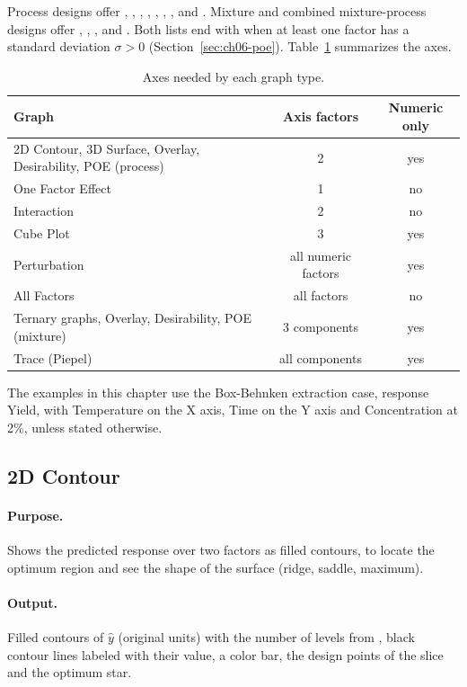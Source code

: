 Process designs offer , , , ,
, , ,  and
. Mixture and combined mixture-process designs offer ,
, ,  and
. Both lists end with  when at least one factor has a
standard deviation $\sigma>0$ (Section~\ref{sec:ch06-poe}). Table~\ref{tab:ch06-axes} summarizes the axes.

\begin{table}[htbp]\centering\small
\caption{Axes needed by each graph type.}\label{tab:ch06-axes}
\begin{tabular}{@{}lcc@{}}
\toprule
Graph & Axis factors & Numeric only \\
\midrule
2D Contour, 3D Surface, Overlay, Desirability, POE (process) & 2 & yes \\
One Factor Effect & 1 & no \\
Interaction & 2 & no \\
Cube Plot & 3 & yes \\
Perturbation & all numeric factors & yes \\
All Factors & all factors & no \\
Ternary graphs, Overlay, Desirability, POE (mixture) & 3 components & yes \\
Trace (Piepel) & all components & yes \\
\bottomrule
\end{tabular}
\end{table}

The examples in this chapter use the Box-Behnken extraction case, response Yield, with Temperature on the
X axis, Time on the Y axis and Concentration at 2\%, unless stated otherwise.

\subsection{2D Contour}\label{sec:ch06-contour}
\paragraph{Purpose.} Shows the predicted response over two factors as filled contours, to locate the
optimum region and see the shape of the surface (ridge, saddle, maximum).

\paragraph{Output.} Filled contours of $\hat y$ (original units) with the number of levels from
, black contour lines labeled with their value, a color bar, the design points of the
slice and the optimum star.

